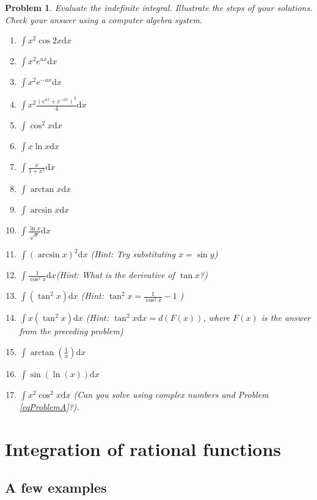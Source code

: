 \documentclass[12pt]{book}
\newcommand{\diff}{\text{d}}
\newtheorem{problem}{Problem}[section]
\begin{document}
\begin{problem}
Evaluate the indefinite integral. Illustrate the steps of your solutions. Check your answer using a computer algebra system.
\begin{multicols}{2}
\begin{enumerate}
\item 
$\int x^2\cos 2x \diff x$
\item 
$\int x^2e^{ax}\diff x$
\item 
$\int x^2e^{-ax}\diff x$
\item \label{eqProblemA}
$\int x^2\frac{(e^{ax}+e^{-ax})^2}4\diff x$ 
\item 
$\int \cos^2x \diff x$ 
\item 
$ \int x\ln x \diff x 
$
\item $\int \frac{x}{1+x^2} \diff x$ 
\item 
$ \int \arctan x \diff x
$
\item 
$ \int \arcsin x \diff x
$
\item $\int \frac{\ln x}{\sqrt{x}}\diff x $
\item $\int (\arcsin x)^2 \diff x $ \quad \quad (Hint: Try substituting $x=\sin y$)
\item $\int \frac{1}{\cos^2 x}\diff x$\quad \quad (Hint: What is the derivative of $\tan x$?)
\item $\int (\tan^2 x) \diff x $ \quad \quad (Hint: $\tan^2 x = \frac{1}{\cos^2x }-1$ )
\item $\int x(\tan^2 x) \diff x $ \quad \quad (Hint: $\tan^2 x \diff x= d(F(x))$, where $F(x)$ is the answer from the preceding problem)
\item 
$
\int\arctan (\frac{1}x)\diff x
$
\item $\int \sin (\ln (x)) \diff x $
\item
$\int x^2\cos^2x \diff x$ (Can you solve using complex numbers and Problem \ref{eqProblemA}?).
\end{enumerate}
\end{multicols}
\end{problem}

\section{Integration of rational functions}

\subsection{A few examples}
\end{document}
